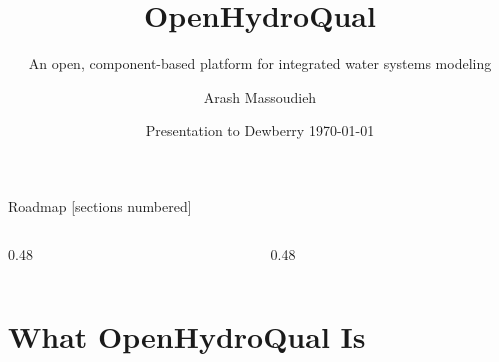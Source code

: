 \documentclass[aspectratio=169, 10pt]{beamer}
\title{OpenHydroQual}
\subtitle{An open, component-based platform for integrated water systems modeling}
\author{Arash Massoudieh}
\institute{EnviroInformatics, LLC \quad\textbar\quad The Catholic University of America}
\date{Presentation to Dewberry \quad\textbar\quad \today}
\begin{document}
\maketitle

\begin{frame}{Roadmap}
  [sections numbered]
  \begin{columns}[T,onlytextwidth]
    \begin{column}{0.48\textwidth}
      \tableofcontents[hideallsubsections, sections={1-4}]
    \end{column}
    \begin{column}{0.48\textwidth}
      \tableofcontents[hideallsubsections, sections={5-8}]
    \end{column}
  \end{columns}
\end{frame}

\section{What OpenHydroQual Is}
\end{document}
